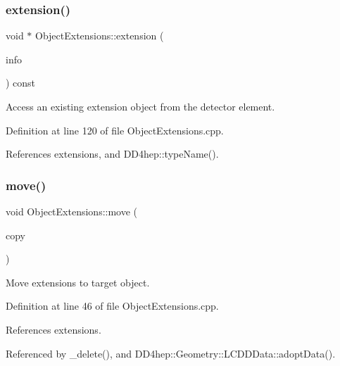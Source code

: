 \subsubsection{\texorpdfstring{extension()}{extension()}\hspace{0.1cm}{\footnotesize\ttfamily [2/2]}}
{\footnotesize\ttfamily void $\ast$ Object\+Extensions\+::extension (\begin{DoxyParamCaption}\item[{const std\+::type\+\_\+info \&}]{info }\end{DoxyParamCaption}) const}



Access an existing extension object from the detector element. 



Definition at line 120 of file Object\+Extensions.\+cpp.



References extensions, and D\+D4hep\+::type\+Name().

\hypertarget{class_d_d4hep_1_1_object_extensions_ab7062b99ac80518aa1b70da47a5d001a}{}\label{class_d_d4hep_1_1_object_extensions_ab7062b99ac80518aa1b70da47a5d001a} 
\subsubsection{\texorpdfstring{move()}{move()}}
{\footnotesize\ttfamily void Object\+Extensions\+::move (\begin{DoxyParamCaption}\item[{\hyperlink{class_d_d4hep_1_1_object_extensions}{Object\+Extensions} \&}]{copy }\end{DoxyParamCaption})}



Move extensions to target object. 



Definition at line 46 of file Object\+Extensions.\+cpp.



References extensions.



Referenced by \+\_\+delete(), and D\+D4hep\+::\+Geometry\+::\+L\+C\+D\+D\+Data\+::adopt\+Data().

\hypertarget{class_d_d4hep_1_1_object_extensions_adb53247f17183725f3fe2c5efd578d0d}{}\label{class_d_d4hep_1_1_object_extensions_adb53247f17183725f3fe2c5efd578d0d} 

